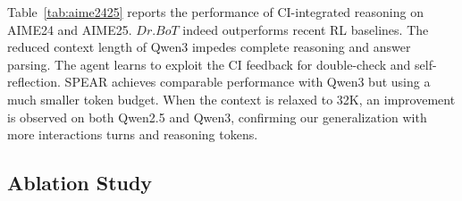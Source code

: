 \documentclass[]{youtu} %
\newcommand{\method}{\textsc{SPEAR}\xspace}
\begin{document}
Table~\ref{tab:aime2425} reports the performance 
of CI-integrated reasoning on AIME24 and AIME25.
$\textit{Dr.BoT}$ indeed outperforms recent RL baselines.
The reduced context length of Qwen3 impedes complete reasoning and answer parsing.
The agent learns to exploit the CI feedback for double-check and self-reflection.
\method achieves comparable performance with Qwen3 but using a much smaller token budget.
When the context is relaxed to 32K,
an improvement is observed on both Qwen2.5 and Qwen3,
confirming our generalization
with more interactions turns and reasoning tokens.





\subsection{Ablation Study}
\label{sec:ablationstudy}
\end{document}
